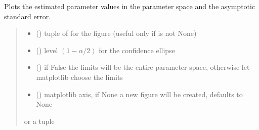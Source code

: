 \documentclass[letterpaper,10pt,english]{sphinxmanual}
\begin{document}
\begin{fulllineitems}
\begin{fulllineitems}
\label{\detokenize{cubmods:cubmods.ihg.CUBresIHG.plot_estim}}
\pysigstartsignatures
{}
\pysigstopsignatures
\sphinxAtStartPar
Plots the estimated parameter values in the parameter space and
the asymptotic standard error.
\begin{quote}\begin{description}
\begin{itemize}
\item {} 
\sphinxAtStartPar
{} () \textendash{} tuple of  for the figure (useful only if  is not None)

\item {} 
\sphinxAtStartPar
{} () \textendash{} level \((1-\alpha/2)\) for the confidence ellipse

\item {} 
\sphinxAtStartPar
{} () \textendash{} if False the limits will be the entire parameter space, otherwise let matplotlib choose the limits

\item {} 
\sphinxAtStartPar
{} (\sphinxstyleliteralemphasis{\sphinxupquote{, }}) \textendash{} matplotlib axis, if None a new figure will be created, defaults to None

\end{itemize}

\sphinxAtStartPar
{} or a tuple 

\end{description}\end{quote}


\end{fulllineitems}
\end{fulllineitems}
\end{document}
